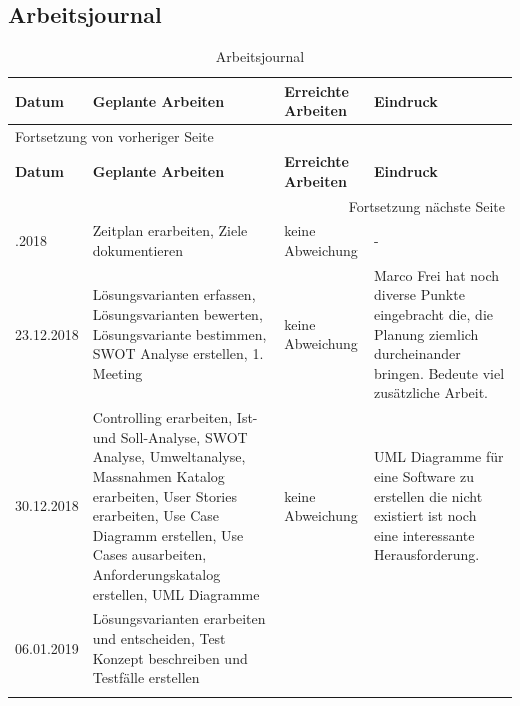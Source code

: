 \newpage
\begin{landscape}
\section{Arbeitsjournal}
\label{sec:orgf31d4c9}

\begin{longtable}{|p{2cm}|p{5cm}|p{5cm}|p{7cm}|}
\hline
\textbf{Datum}\cellcolor[HTML]{C0C0C0} & \textbf{Geplante Arbeiten}\cellcolor[HTML]{C0C0C0} & \textbf{Erreichte Arbeiten}\cellcolor[HTML]{C0C0C0} & \textbf{Eindruck}\cellcolor[HTML]{C0C0C0}\\
\hline
\endfirsthead
\multicolumn{4}{l}{Fortsetzung von vorheriger Seite} \\
\hline

\textbf{Datum}\cellcolor[HTML]{C0C0C0} & \textbf{Geplante Arbeiten}\cellcolor[HTML]{C0C0C0} & \textbf{Erreichte Arbeiten}\cellcolor[HTML]{C0C0C0} & \textbf{Eindruck}\cellcolor[HTML]{C0C0C0} \\

\hline
\endhead
\hline\multicolumn{4}{r}{Fortsetzung nächste Seite} \\
\endfoot
\endlastfoot
\hline
16.12.2018 & Zeitplan erarbeiten, Ziele dokumentieren & keine Abweichung & -\\
\hline
23.12.2018 & Lösungsvarianten erfassen, Lösungsvarianten bewerten, Lösungsvariante bestimmen, SWOT Analyse erstellen, 1. Meeting & keine Abweichung & Marco Frei hat noch diverse Punkte eingebracht die, die Planung ziemlich durcheinander bringen. Bedeute viel zusätzliche Arbeit.\\
\hline
30.12.2018 & Controlling erarbeiten, Ist- und Soll-Analyse, SWOT Analyse, Umweltanalyse, Massnahmen Katalog erarbeiten, User Stories erarbeiten, Use Case Diagramm erstellen, Use Cases ausarbeiten, Anforderungskatalog erstellen, UML Diagramme & keine Abweichung & UML Diagramme für eine Software zu erstellen die nicht existiert ist noch eine interessante Herausforderung.\\
\hline
06.01.2019 & Lösungsvarianten erarbeiten und entscheiden, Test Konzept beschreiben und Testfälle erstellen &  & \\
\hline
\caption{\label{tab:org109e680}
Arbeitsjournal}
\\
\end{longtable}
\end{landscape}
